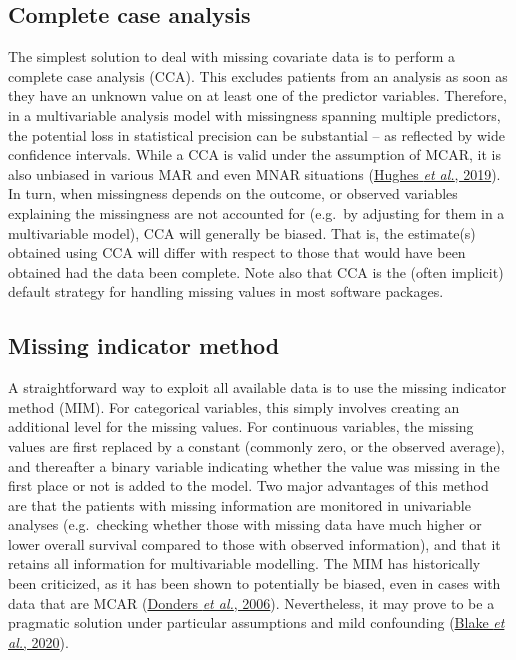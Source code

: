 \documentclass[
  letterpaper,
  DIV=11,
  numbers=noendperiod]{scrreprt}
\begin{document}
\hypertarget{complete-case-analysis}{%
\subsection{Complete case analysis}\label{complete-case-analysis}}

The simplest solution to deal with missing covariate data is to perform
a complete case analysis (CCA). This excludes patients from an analysis
as soon as they have an unknown value on at least one of the predictor
variables. Therefore, in a multivariable analysis model with missingness
spanning multiple predictors, the potential loss in statistical
precision can be substantial -- as reflected by wide confidence
intervals. While a CCA is valid under the assumption of MCAR, it is also
unbiased in various MAR and even MNAR situations
(\protect\hyperlink{ref-hughesAccountingMissingData2019}{Hughes \emph{et
al.}, 2019}). In turn, when missingness depends on the outcome, or
observed variables explaining the missingness are not accounted for
(e.g.~by adjusting for them in a multivariable model), CCA will
generally be biased. That is, the estimate(s) obtained using CCA will
differ with respect to those that would have been obtained had the data
been complete. Note also that CCA is the (often implicit) default
strategy for handling missing values in most software packages.

\hypertarget{missing-indicator-method}{%
\subsection{Missing indicator method}\label{missing-indicator-method}}

A straightforward way to exploit all available data is to use the
missing indicator method (MIM). For categorical variables, this simply
involves creating an additional level for the missing values. For
continuous variables, the missing values are first replaced by a
constant (commonly zero, or the observed average), and thereafter a
binary variable indicating whether the value was missing in the first
place or not is added to the model. Two major advantages of this method
are that the patients with missing information are monitored in
univariable analyses (e.g.~checking whether those with missing data have
much higher or lower overall survival compared to those with observed
information), and that it retains all information for multivariable
modelling. The MIM has historically been criticized, as it has been
shown to potentially be biased, even in cases with data that are MCAR
(\protect\hyperlink{ref-dondersReviewGentleIntroduction2006}{Donders
\emph{et al.}, 2006}). Nevertheless, it may prove to be a pragmatic
solution under particular assumptions and mild confounding
(\protect\hyperlink{ref-blakeEstimatingTreatmentEffects2020}{Blake
\emph{et al.}, 2020}).
\end{document}
